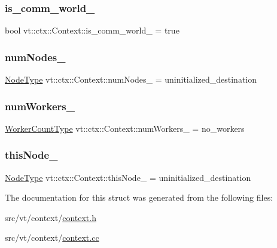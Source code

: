 \subsubsection{\texorpdfstring{is\+\_\+comm\+\_\+world\+\_\+}{is\_comm\_world\_}}
{\footnotesize\ttfamily bool vt\+::ctx\+::\+Context\+::is\+\_\+comm\+\_\+world\+\_\+ = true\hspace{0.3cm}{\ttfamily [private]}}

\mbox{\label{structvt_1_1ctx_1_1_context_a58cc20215314e915f43b829ad0470299}} 
\subsubsection{\texorpdfstring{num\+Nodes\+\_\+}{numNodes\_}}
{\footnotesize\ttfamily \hyperlink{namespacevt_a866da9d0efc19c0a1ce79e9e492f47e2}{Node\+Type} vt\+::ctx\+::\+Context\+::num\+Nodes\+\_\+ = uninitialized\+\_\+destination\hspace{0.3cm}{\ttfamily [private]}}

\mbox{\label{structvt_1_1ctx_1_1_context_a16e8488c6e6ad26c387ad6ef19f726b9}} 
\subsubsection{\texorpdfstring{num\+Workers\+\_\+}{numWorkers\_}}
{\footnotesize\ttfamily \hyperlink{namespacevt_aa93398ea48f2cb6c188512250f7cc248}{Worker\+Count\+Type} vt\+::ctx\+::\+Context\+::num\+Workers\+\_\+ = no\+\_\+workers\hspace{0.3cm}{\ttfamily [private]}}

\mbox{\label{structvt_1_1ctx_1_1_context_a5fcea79d2fede6e9945433621894624c}} 
\subsubsection{\texorpdfstring{this\+Node\+\_\+}{thisNode\_}}
{\footnotesize\ttfamily \hyperlink{namespacevt_a866da9d0efc19c0a1ce79e9e492f47e2}{Node\+Type} vt\+::ctx\+::\+Context\+::this\+Node\+\_\+ = uninitialized\+\_\+destination\hspace{0.3cm}{\ttfamily [private]}}



The documentation for this struct was generated from the following files\+:\begin{DoxyCompactItemize}
\item 
src/vt/context/\hyperlink{context_8h}{context.\+h}\item 
src/vt/context/\hyperlink{context_8cc}{context.\+cc}\end{DoxyCompactItemize}
